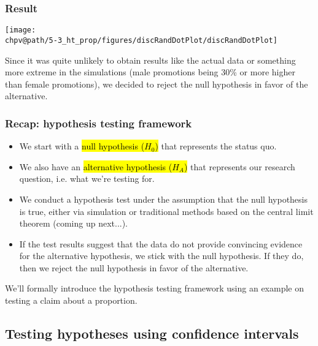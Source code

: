 \documentclass[t,compress,mathserif]{beamer}
\makeatletter
\def\chpv@path{../../Chp 5}
\makeatother
\begin{document}

\begin{frame}
\frametitle{Result}

\begin{center}
\texttt{[image: \\chpv@path/5-3\_ht\_prop/figures/discRandDotPlot/discRandDotPlot]}
\end{center}

\pause

Since it was quite unlikely to obtain results like the actual data or something more extreme in the simulations (male promotions being 30\% or more higher than female promotions), we decided to reject the null hypothesis in favor of the alternative.

\end{frame}


\begin{frame}
\frametitle{Recap: hypothesis testing framework}

\begin{itemize}
\item We start with a \hl{null hypothesis ($H_0$)} that represents the status quo.
\pause
\item We also have an \hl{alternative hypothesis ($H_A$)} that represents our research question, i.e. what we're testing for.
\pause
\item We conduct a hypothesis test under the assumption that the null hypothesis is true, either via simulation or traditional methods based on the central limit theorem (coming up next...).
\pause
\item If the test results suggest that the data do not provide convincing evidence for the alternative hypothesis, we stick with the null hypothesis. If they do, then we reject the null hypothesis in favor of the alternative.
\end{itemize}
\pause
We'll formally introduce the hypothesis testing framework using an example on testing a claim about a proportion.

\end{frame}


 \subsection{Testing hypotheses using confidence intervals} 
\end{document}
